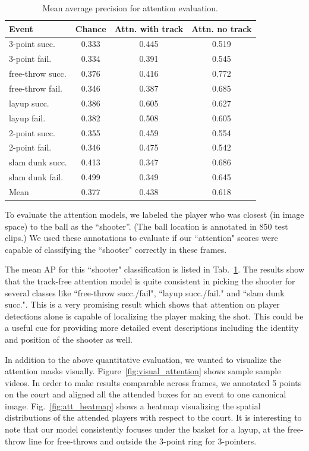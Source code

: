 \begin{table}[ht!]
\begin{center}
\small
 \begin{tabular}{|l|c|c|c|}
  \hline
Event            & Chance & Attn. with track & Attn. no track \\ \hline \hline
3-point succ.    & 0.333 & 0.445 & 0.519 \\ 
3-point fail.    & 0.334 & 0.391 & 0.545 \\ 
free-throw succ. & 0.376 & 0.416 & 0.772 \\ 
free-throw fail. & 0.346 & 0.387 & 0.685 \\  
layup succ.      & 0.386 & 0.605 & 0.627 \\ 
layup fail.      & 0.382 & 0.508 & 0.605 \\ 
2-point succ.    & 0.355 & 0.459 & 0.554 \\ 
2-point fail.    & 0.346 & 0.475 & 0.542 \\ 
slam dunk succ.  & 0.413 & 0.347 & 0.686 \\ 
slam dunk fail.  & 0.499 & 0.349 & 0.645 \\ \hline \hline  
Mean             & 0.377 & 0.438 & 0.618 \\ \hline
  \end{tabular}
\end{center}
  \caption{Mean average precision for attention evaluation.}
  \label{tab:attention_res}
\end{table}

To evaluate the attention models, we  labeled the player who was
closest (in image space) to the ball as the ``shooter''.
(The ball location is annotated in 850 test clips.)
We used these annotations to evaluate if our ``attention" scores
were capable of classifying the ``shooter" correctly in these frames.


The mean AP for this ``shooter"  classification is listed
in Tab.~\ref{tab:attention_res}.
The results show that the track-free attention model is quite consistent in picking
the shooter for several classes like ``free-throw succ./fail",
``layup succ./fail." and ``slam dunk succ.". This is a very
promising result which shows that attention on player detections
alone is capable of localizing the player making the shot. This could be
a useful cue for providing more detailed event descriptions
including the identity and position of the shooter as well.

In addition to the above quantitative evaluation, we wanted to
visualize the attention masks visually.
Figure~\ref{fig:visual_attention} shows sample sample videos.
In order to make results comparable across frames, 
we annotated 5 points on the court and
aligned all the attended boxes for an event to one canonical image. 
Fig.~\ref{fig:att_heatmap} shows a heatmap  visualizing the spatial distributions
of the attended players with respect to the court. It is interesting to note that
our model consistently focuses under the basket for a layup, at the free-throw
line for free-throws and outside the 3-point ring for 3-pointers.

